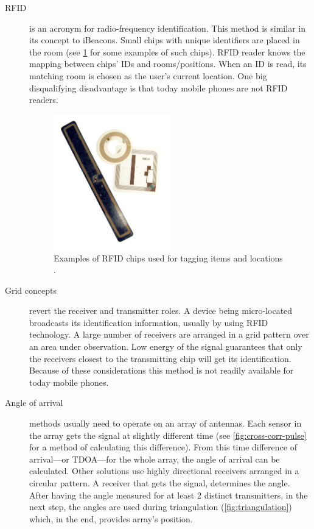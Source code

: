 \begin{description}
	\item[RFID] is an acronym for radio-frequency identification. This method is similar in its concept to iBeacons. Small chips with unique identifiers are placed in the room (see \cref{fig:rfid} for some examples of such chips). RFID reader knows the mapping between chips' IDs and rooms/positions. When an ID is read, its matching room is chosen as the user's current location. One big disqualifying disadvantage is that today mobile phones are not RFID readers.
	
	\begin{figure}[h]
		\centering
		\includegraphics[width=0.5\textwidth]{rfid}
		\caption{Examples of RFID chips used for tagging items and locations \cite{wiki:rfid}.}
		\label{fig:rfid}
	\end{figure}
	
	\item[Grid concepts] revert the receiver and transmitter roles. A device being micro-located broadcasts its identification information, usually by using RFID technology. A large number of receivers are arranged in a grid pattern over an area under observation. Low energy of the signal guarantees that only the receivers closest to the transmitting chip will get its identification. Because of these considerations this method is not readily available for today mobile phones.
	
	\item[Angle of arrival] methods usually need to operate on an array of antennas. Each sensor in the array gets the signal at slightly different time (see \cref{fig:cross-corr-pulse} for a method of calculating this difference). From this time difference of arrival---or TDOA---for the whole array, the angle of arrival can be calculated. Other solutions use highly directional receivers arranged in a circular pattern. A receiver that gets the signal, determines the angle. After having the angle measured for at least 2 distinct transmitters, in the next step, the angles are used during triangulation (\cref{fig:triangulation}) which, in the end, provides array's position.
	

\end{description}
